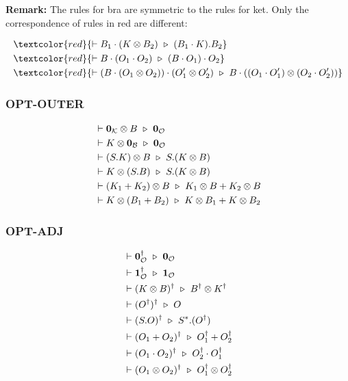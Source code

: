\textbf{Remark: } The rules for bra are symmetric to the rules for ket. Only the correspondence of rules in red are different:

\begin{align*}
  & \textcolor{red}{\vdash B_1 \cdot (K \otimes B_2) \reduce (B_1 \cdot K).B_2} \\
  & \textcolor{red}{\vdash B \cdot (O_1 \cdot O_2) \reduce (B \cdot O_1) \cdot O_2} \\
  & \textcolor{red}{\vdash (B \cdot (O_1 \otimes O_2)) \cdot (O_1' \otimes O_2') \reduce B \cdot ((O_1 \cdot O_1') \otimes (O_2 \cdot O_2'))}
\end{align*}

\subsubsection*{\textsf{OPT-OUTER}}
\begin{align*}
  & \vdash \mathbf{0}_\mathcal{K} \otimes B \ \triangleright\  \mathbf{0}_\mathcal{O} \\
  & \vdash K \otimes \mathbf{0}_\mathcal{B} \ \triangleright\  \mathbf{0}_\mathcal{O} \\
  & \vdash (S.K) \otimes B \ \triangleright\  S.(K \otimes B) \\
  & \vdash K \otimes (S.B) \ \triangleright\  S.(K \otimes B) \\
  & \vdash (K_1 + K_2) \otimes B \ \triangleright\  K_1 \otimes B + K_2 \otimes B \\
  & \vdash K \otimes (B_1 + B_2) \ \triangleright\  K \otimes B_1 + K \otimes B_2
\end{align*}


\subsubsection*{\textsf{OPT-ADJ}}
\begin{align*}
  & \vdash \textbf{0}_\mathcal{O}^\dagger \ \triangleright\  \textbf{0}_\mathcal{O} \\
  & \vdash \textbf{1}_\mathcal{O}^\dagger \ \triangleright\  \textbf{1}_\mathcal{O} \\
  & \vdash (K \otimes B)^\dagger \ \triangleright\  B^\dagger \otimes K^\dagger \\
  & \vdash (O^\dagger)^\dagger \ \triangleright\  O \\
  & \vdash (S.O)^\dagger \ \triangleright\  S^*.(O^\dagger) \\
  & \vdash (O_1 + O_2)^\dagger \ \triangleright\  O_1^\dagger + O_2^\dagger\\
  & \vdash (O_1 \cdot O_2)^\dagger \ \triangleright\  O_2^\dagger \cdot O_1^\dagger \\
  & \vdash (O_1 \otimes O_2)^\dagger \ \triangleright\  O_1^\dagger \otimes O_2^\dagger
\end{align*}

